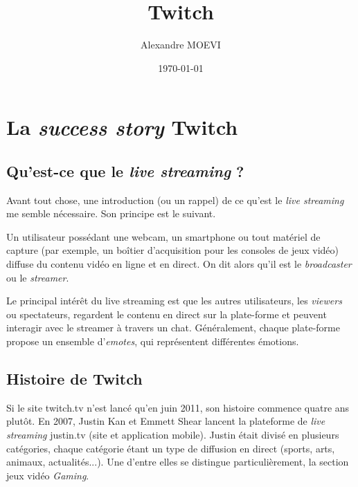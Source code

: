 \documentclass[a4paper]{article}
\title{Twitch}
\author{Alexandre MOEVI}
\date{\today}
\begin{document}
\maketitle



%
%

\section{La \textit{success story} Twitch}
\subsection{Qu'est-ce que le \textit{live streaming} ?}
Avant tout chose, une introduction (ou un rappel) de ce qu'est le \textit{live streaming} me semble nécessaire. Son principe est le suivant.

Un utilisateur possédant une webcam, un smartphone ou tout matériel de capture (par exemple, un boîtier d'acquisition pour les consoles de jeux vidéo) diffuse du contenu vidéo en ligne et en direct. On dit alors qu'il est le \textit{broadcaster} ou le \textit{streamer}. 

Le principal intérêt du live streaming est que les autres utilisateurs, les \textit{viewers} ou spectateurs, regardent le contenu en direct sur la plate-forme et peuvent interagir avec le streamer à travers un chat. Généralement, chaque plate-forme propose un ensemble d'\textit{emotes}, qui représentent différentes émotions. 

\subsection{Histoire de Twitch}
Si le site twitch.tv n'est lancé qu'en juin 2011, son histoire commence quatre ans plutôt. En 2007, Justin Kan et Emmett Shear lancent la plateforme de \textit{live streaming} justin.tv (site et application mobile). Justin était divisé en plusieurs catégories, chaque catégorie étant un type de diffusion en direct (sports, arts, animaux, actualités...). Une d'entre elles se distingue particulièrement, la section jeux vidéo \textit{Gaming}.
\end{document}
